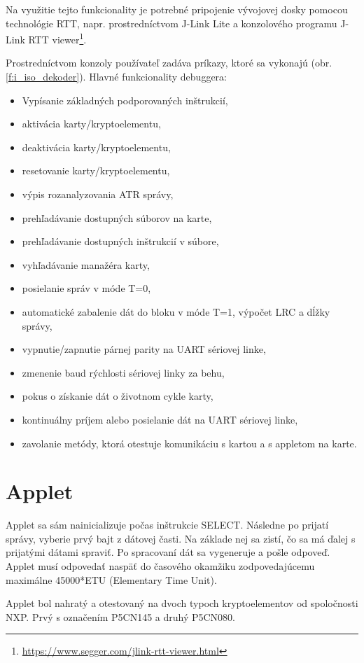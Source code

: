 \documentclass[12pt,a4paper,oneside,openright]{report}
\begin{document}
	Na využitie tejto funkcionality je potrebné pripojenie vývojovej dosky pomocou technológie RTT, napr. prostredníctvom J-Link Lite a konzolového programu J-Link RTT viewer\footnote{\url{https://www.segger.com/jlink-rtt-viewer.html}}.
	
	Prostredníctvom konzoly používateľ zadáva príkazy, ktoré sa vykonajú (obr. \ref{f:i_iso_dekoder}).
	Hlavné funkcionality debuggera:
	\singlespacing
	\begin{itemize}
		\item Vypísanie základných podporovaných inštrukcií,
		\item aktivácia karty/kryptoelementu,
		\item deaktivácia karty/kryptoelementu,
		\item resetovanie karty/kryptoelementu,
		\item výpis rozanalyzovania ATR správy,
		\item prehľadávanie dostupných súborov na karte,
		\item prehľadávanie dostupných inštrukcií v súbore,
		\item vyhľadávanie manažéra karty,		
		\item posielanie správ v móde T=0,
		\item automatické zabalenie dát do bloku v móde T=1, výpočet LRC a dĺžky správy,
		\item vypnutie/zapnutie párnej parity na UART sériovej linke,
		\item zmenenie baud rýchlosti sériovej linky za behu,
		\item pokus o získanie dát o životnom cykle karty,
		\item kontinuálny príjem alebo posielanie dát na UART sériovej linke,
		\item zavolanie metódy, ktorá otestuje komunikáciu s kartou a s appletom na karte.
	\end{itemize}
		\onehalfspacing

\section{Applet}
	Applet sa sám nainicializuje počas inštrukcie SELECT. Následne po prijatí správy, vyberie prvý bajt z dátovej časti. Na základe nej sa zistí, čo sa má ďalej s prijatými dátami spraviť. Po spracovaní dát sa vygeneruje a pošle odpoveď. Applet musí odpovedať naspäť do časového okamžiku zodpovedajúcemu maximálne 45000*ETU (Elementary Time Unit).
	
	Applet bol nahratý a otestovaný na dvoch typoch kryptoelementov od spoločnosti NXP. Prvý s označením P5CN145 a druhý P5CN080.
	
\end{document}
